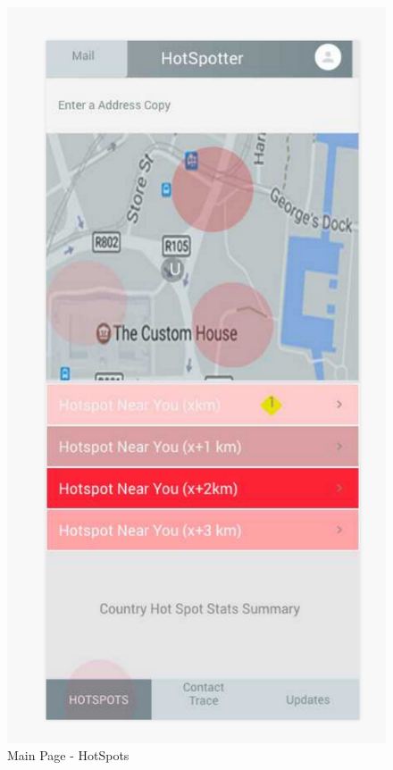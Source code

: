 \documentclass{scrreprt}
\begin{document}
\begin{figure}[H]
	\centering
	\includegraphics[page=1, width=0.9\linewidth]{COMP30830-Hotspots}
	\caption{Main Page - HotSpots}
	\label{HotSpots}
\end{figure}
\end{document}
